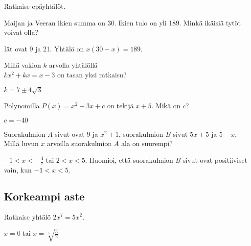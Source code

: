 \begin{tehtavasivu}
\begin{tehtava} 
Ratkaise epäyhtälöt.
		\begin{alakohdat}
		\end{alakohdat}
    \begin{vastaus}
		\begin{alakohdat}
		\alakohta{$ -2 < x < 3 $}
		\alakohta{$x \leq 0$ tai $x \geq 5$}
	\end{alakohdat}
    \end{vastaus}
\end{tehtava}

\begin{tehtava} 
Maijan ja Veeran ikien summa on 30. Ikien tulo on yli 189. Minkä ikäisiä tytöt voivat olla?
    \begin{vastaus}
	Iät ovat 9 ja 21. Yhtälö on $x(30-x)=189$.
	\end{vastaus}
\end{tehtava}

\begin{tehtava} 
Millä vakion $k$ arvolla yhtälöllä \\ $kx^2+kx=x-3$ on tasan yksi ratkaisu?
    \begin{vastaus}
		$k = 7 \pm 4 \sqrt{3}$
    \end{vastaus}
\end{tehtava}

\begin{tehtava} 
Polynomilla $P(x)=x^2-3x+c$ on tekijä $x+5$. Mikä on $c$?
    \begin{vastaus}
		$c=-40$
    \end{vastaus}
\end{tehtava}

\begin{tehtava} 
Suorakulmion $A$ sivut ovat $9$ ja $x^2+1$, suorakulmion $B$ sivut $5x+5$
ja $5-x$. Millä luvun $x$ arvoilla suorakulmion $A$ ala on suurempi?
    \begin{vastaus}
	$-1 < x < -\frac{4}{7}$ tai $2 < x < 5$. Huomioi, että suorakulmion $B$
    sivut ovat positiiviset vain, kun $-1<x<5$.
    \end{vastaus}
\end{tehtava}

\subsection*{Korkeampi aste}

\begin{tehtava} 
Ratkaise yhtälö $2x^7=5x^2$.
    \begin{vastaus}
		$x=0$ tai $x=\sqrt[5]{\frac{5}{2}}$
    \end{vastaus}
\end{tehtava}


\end{tehtavasivu}
